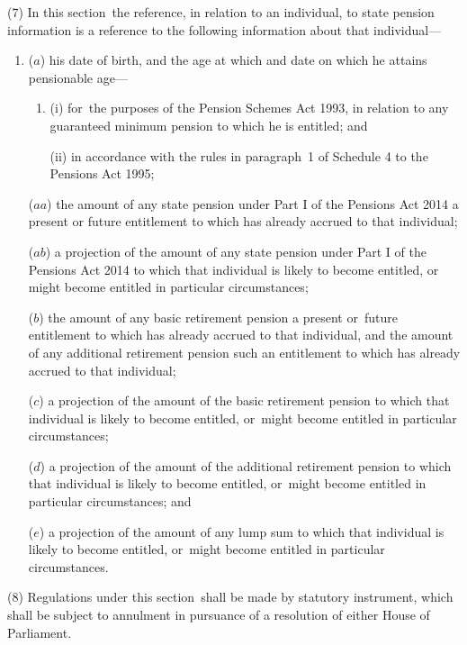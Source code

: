 \documentclass[12pt,a4paper]{article}
\begin{document}
(7) In this section~the reference, in relation to an individual, to state pension information is a reference to the following information about that individual—
\begin{enumerate}\item[]
($a$) his date of birth, and the age at which and date on which he attains pensionable age—
\begin{enumerate}\item[]
(i) for~the purposes of the Pension Schemes Act 1993, in relation to any guaranteed minimum pension to which he is entitled; and

(ii) in accordance with the rules in paragraph~1 of Schedule 4 to the Pensions Act 1995;
\end{enumerate}

($aa$) the amount of any state pension under Part I of the Pensions Act 2014 a present or future entitlement to which has already accrued to that individual;

($ab$) a projection of the amount of any state pension under Part I of the Pensions Act 2014 to which that individual is likely to become entitled, or might become entitled in particular circumstances;

($b$) the amount of any basic retirement pension a present or~future entitlement to which has already accrued to that individual, and the amount of any additional retirement pension such an entitlement to which has already accrued to that individual;

($c$) a projection of the amount of the basic retirement pension to which that individual is likely to become entitled, or~might become entitled in particular circumstances; 

($d$) a projection of the amount of the additional retirement pension to which that individual is likely to become entitled, or~might become entitled in particular circumstances;
%
and

($e$) a projection of the amount of any lump sum to which that individual is likely to become entitled, or~might become entitled in particular circumstances.
\end{enumerate}

(8) Regulations under this section~shall be made by statutory instrument, which shall be subject to annulment in pursuance of a resolution of either House of Parliament.
\end{document}
